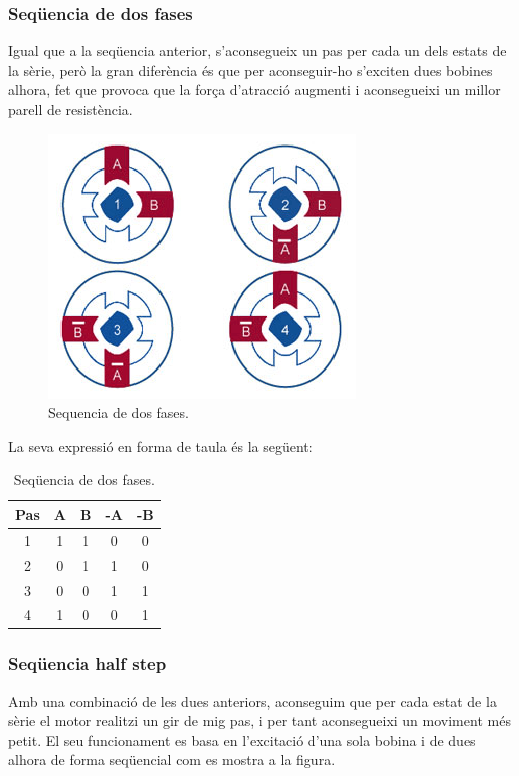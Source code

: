 \subsubsection{Seqüencia de dos fases}
Igual que a la seqüencia anterior, s'aconsegueix un pas per cada un dels estats de la sèrie, però la gran diferència és que per aconseguir-ho s'exciten dues bobines alhora, fet que provoca que la força d'atracció augmenti i aconsegueixi un millor parell de resistència. 
\begin{figure}[H]
	\centering
	\includegraphics[scale=1.2]{Sequencia_2_fases.eps}
	\caption{Sequencia de dos fases.}
	\label{fig:Sequencia de dos fase}
\end{figure}
La seva expressió en forma de taula és la següent:
\begin{table}[H]
	\begin{center}
		\begin{tabular}{|c||c|c|c|c|}
			\hline
			Pas & A & B & -A & -B \\
			\hline \hline
			1 & 1 & 1 & 0 & 0 \\ \hline
			2 & 0 & 1 & 1 & 0 \\ \hline
			3 & 0 & 0 & 1 & 1 \\ \hline
			4 & 1 & 0 & 0 & 1 \\ \hline
		\end{tabular}
		\caption{Seqüencia de dos fases.}
		\label{tabla:2fase}
	\end{center}
\end{table}


\subsubsection{Seqüencia half step }
Amb una combinació de les dues anteriors, aconseguim que per cada estat de la sèrie el motor realitzi un gir de mig pas, i per tant aconsegueixi un moviment més petit. El seu funcionament es basa en l'excitació d'una sola bobina i de dues alhora de forma seqüencial com es mostra  a la figura.

